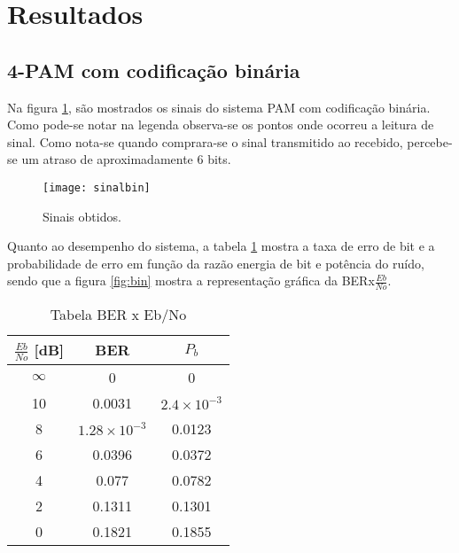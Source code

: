 \newpage
\section{Resultados}

\subsection{4-PAM com codificação binária}

Na figura \ref{fig:sinais1}, são mostrados os sinais do sistema PAM com codificação binária. Como pode-se notar na legenda observa-se os pontos onde ocorreu a leitura de sinal. Como nota-se quando comprara-se o sinal transmitido ao recebido, percebe-se um atraso de aproximadamente 6 bits.

\begin{figure}[H]
    \centering
    \texttt{[image: sinalbin]}
    \caption{Sinais obtidos.}
    \label{fig:sinais1}
\end{figure}

Quanto ao desempenho do sistema, a tabela \ref{tab:3} mostra a taxa de erro de bit e a probabilidade de erro em função da razão energia de bit e potência do ruído, sendo que a figura \ref{fig:bin} mostra a representação gráfica da BERx$\frac{Eb}{No}$.

\begin{small}
    \begin{table}[H]
        \begin{center}
            \caption{Tabela BER x Eb/No}
            \begin{tabular}{c|c|c}
                \hline
                $\frac{Eb}{No}$ [dB] & BER & $P_b$ \\
                \hline
                $\infty$ & 0 & 0 \\
                \hline
                10 & 0.0031  & $2.4 \times 10^{-3} $ \\
                \hline
                8 & $1.28 \times 10^{-3}$ & 0.0123 \\
                \hline
                6 & 0.0396 &  0.0372 \\
                \hline
                4 & 0.077 &  0.0782 \\
                \hline
                2 & 0.1311 & 0.1301 \\
                \hline
                0 & 0.1821 & 0.1855 \\
                \hline
            \end{tabular}
            \label{tab:3}
        \end{center}
    \end{table}
\end{small}

